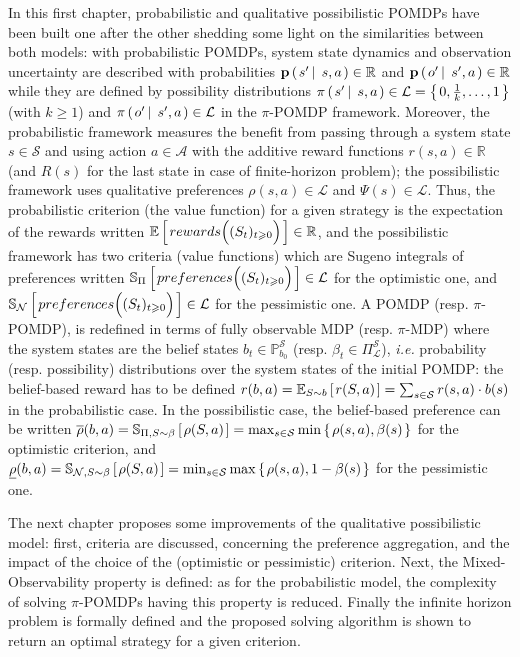 In this first chapter, probabilistic and qualitative possibilistic POMDPs have been built one after the other
shedding some light on the similarities between both models:
with probabilistic POMDPs, system state dynamics and observation uncertainty 
are described with probabilities $\textbf{p} \left( \left.  s' \, \right| \left. \, s,a  \right. \right) \in \mathbb{R}$
and $\textbf{p} \left( \left.  o' \, \right| \left. \, s',a  \right. \right) \in \mathbb{R}$
while they are defined by possibility distributions $\pi \left( \left.  s' \, \right| \left. \, s,a  \right. \right) \in \mathcal{L} = \left\{ \left.  0, \frac{1}{k}, \ldots, 1 \right. \right\}$ (with $k\geqslant1$) 
and $\pi \left( \left.  o' \, \right| \left. \, s',a  \right. \right) \in \mathcal{L}$ 
in the $\pi$-POMDP framework.
Moreover, the probabilistic framework measures the benefit from passing through a system state $s \in \mathcal{S}$ and using action $a \in \mathcal{A}$
with the additive reward functions $r(s,a) \in \mathbb{R}$ (and $R(s)$ for the last state in case of finite-horizon problem);
the possibilistic framework uses qualitative preferences $\rho(s,a) \in \mathcal{L}$ and $\Psi(s) \in \mathcal{L}$.
Thus, the probabilistic criterion (the value function) for a given strategy 
is the expectation of the rewards written $\mathbb{E} \left[ \left.  rewards\Big( (S_t)_{t\geqslant0} \Big)  \right. \right] \in \mathbb{R}$, 
and the possibilistic framework has two criteria (value functions) which are Sugeno integrals of preferences written 
$\mathbb{S}_{\Pi} \left[ \left.  preferences\Big( (S_t)_{t\geqslant0} \Big)  \right. \right] \in \mathcal{L}$ for the optimistic one,
and $\mathbb{S}_{\mathcal{N}} \left[ \left.  preferences\Big( (S_t)_{t\geqslant0} \Big)  \right. \right] \in \mathcal{L}$ for the pessimistic one.
A POMDP (resp. $\pi$-POMDP), is redefined in terms of fully observable MDP (resp. $\pi$-MDP)
where the system states are the belief states $b_t \in \mathbb{P}^{\mathcal{S}}_{b_0}$ (resp. $\beta_t \in \Pi^{\mathcal{S}}_{\mathcal{L}}$), 
\textit{i.e.} probability (resp. possibility) distributions over the system states of the initial POMDP:
the belief-based reward has to be defined $r(b,a) = \mathbb{E}_{S \sim b} \left[ \left.  r(S,a)  \right. \right] = \sum_{s \in \mathcal{S}} r(s,a) \cdot b(s)$
in the probabilistic case. In the possibilistic case, the belief-based preference 
can be written $\overline{\rho}(b,a) = \mathbb{S}_{\Pi, S \sim \beta} \left[ \left.  \rho(S,a)  \right. \right] = \max_{s \in \mathcal{S}} \min \left\{ \left.  \rho(s,a), \beta(s)  \right. \right\}$
for the optimistic criterion,
and $\underline{\rho}(b,a) = \mathbb{S}_{\mathcal{N}, S \sim \beta} \left[ \left.  \rho(S,a)  \right. \right] = \min_{s \in \mathcal{S}} \max \left\{ \left.  \rho(s,a), 1 - \beta(s)  \right. \right\}$
for the pessimistic one.

The next chapter proposes some improvements of the qualitative possibilistic model: 
first, criteria are discussed, concerning the preference aggregation, 
and the impact of the choice of the (optimistic or pessimistic) criterion.
Next, the Mixed-Observability property is defined:
as for the probabilistic model,
the complexity of solving $\pi$-POMDPs having this property is reduced.
Finally the infinite horizon problem is formally defined
and the proposed solving algorithm is shown to return an
optimal strategy for a given criterion.
